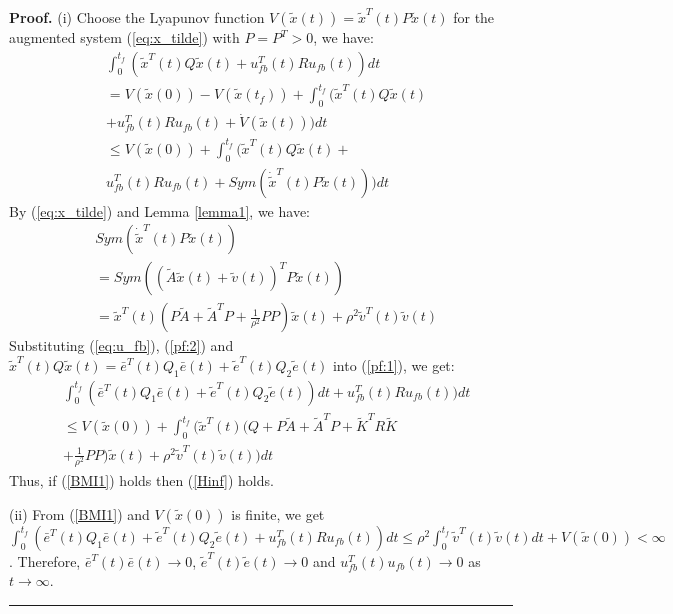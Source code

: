 \documentclass{ieeeaccess}
\newenvironment{proof}[1][Proof]{\noindent\textbf{#1.} }{\ \rule{0.5em}{0.5em}}
\begin{document}
\begin{proof}
    (i) Choose the Lyapunov function $V(\tilde{x}(t))=\tilde{x}^T(t)P\tilde{x}(t)$ for the augmented system (\ref{eq:x_tilde}) with $P=P^T>0$, we have:
    \begin{equation} \label{pf:1}
        \begin{split}
            & \int_{0}^{t_f}(\tilde{x}^T(t)Q\tilde{x}(t) + u_{fb}^T(t)Ru_{fb}(t))dt \\
            & = V(\tilde{x}(0)) - V(\tilde{x}(t_f)) + \int_{0}^{t_f}(\tilde{x}^T(t)Q\tilde{x}(t) \\
            & + u_{fb}^T(t)Ru_{fb}(t) + \dot{V}(\tilde{x}(t)))dt \\
            & \leq V(\tilde{x}(0)) + \int_{0}^{t_f}(\tilde{x}^T(t)Q\tilde{x}(t) + \\
            & u_{fb}^T(t)Ru_{fb}(t) + Sym(\dot{\tilde{x}}^T(t)P\tilde{x}(t)))dt
        \end{split}
    \end{equation}
    By (\ref{eq:x_tilde}) and Lemma \ref{lemma1}, we have:
    \begin{equation} \label{pf:2}
        \begin{split}
            & Sym(\dot{\tilde{x}}^T(t)P\tilde{x}(t)) \\
            & = Sym((\tilde{A}\tilde{x}(t)+\tilde{v}(t))^TP\tilde{x}(t)) \\
            & = \tilde{x}^T(t)(P\tilde{A} + \tilde{A}^T P + \frac{1}{\rho^2}PP)\tilde{x}(t) + \rho^2\tilde{v}^T(t)\tilde{v}(t)
        \end{split}
    \end{equation}
    Substituting (\ref{eq:u_fb}), (\ref{pf:2}) and $\tilde{x}^T(t)Q\tilde{x}(t)=\bar{e}^T(t)Q_1\bar{e}(t)+\tilde{e}^T(t)Q_2\tilde{e}(t)$ into (\ref{pf:1}), we get:
    \begin{equation*} \label{pf:3}
        \begin{split}
            & \int_{0}^{t_f}(\bar{e}^T(t)Q_1\bar{e}(t)+\tilde{e}^T(t)Q_2\tilde{e}(t))dt + u_{fb}^T(t)Ru_{fb}(t))dt \\
            & \leq V(\tilde{x}(0)) + \int_{0}^{t_f}(\tilde{x}^T(t)(Q + P\tilde{A} + \tilde{A}^T P +\tilde{K}^TR\tilde{K}\\
            & + \frac{1}{\rho^2}PP)\tilde{x}(t) + \rho^2\tilde{v}^T(t)\tilde{v}(t))dt
        \end{split}
    \end{equation*}
    Thus, if (\ref{BMI1}) holds then (\ref{Hinf}) holds.

    (ii) From (\ref{BMI1}) and $V(\tilde{x}(0))$ is finite, we get $\int_{0}^{t_f}(\bar{e}^T(t)Q_1\bar{e}(t) + \tilde{e}^T(t)Q_2\tilde{e}(t) + u_{fb}^T(t)Ru_{fb}(t))dt 
    \leq \rho^2 \int_{0}^{t_f}\tilde{v}^T(t)\tilde{v}(t)dt + V(\tilde{x}(0)) 
    < \infty$. Therefore, $\bar{e}^T(t)\bar{e}(t)\rightarrow 0$, $\tilde{e}^T(t)\tilde{e}(t)\rightarrow 0$ and $u_{fb}^T(t)u_{fb}(t)\rightarrow 0$ as $t\rightarrow \infty$.
\end{proof}
\end{document}
